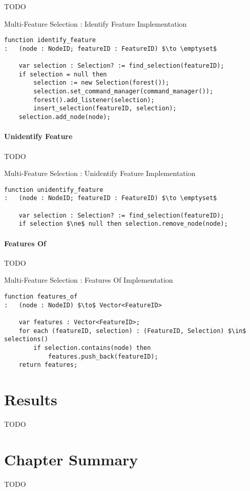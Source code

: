TODO

\begin{stulisting}[p]
\caption{Multi-Feature Selection : Identify Feature Implementation}
\label{code:ipfs-mfs-identifyfeature}
\begin{lstlisting}[style=Default]
function identify_feature
:	(node : NodeID; featureID : FeatureID) $\to \emptyset$

	var selection : Selection? := find_selection(featureID);
	if selection = null then
		selection := new Selection(forest());
		selection.set_command_manager(command_manager());
		forest().add_listener(selection);
		insert_selection(featureID, selection);
	selection.add_node(node);
\end{lstlisting}
\end{stulisting}

\paragraph{Unidentify Feature}

TODO

\begin{stulisting}[p]
\caption{Multi-Feature Selection : Unidentify Feature Implementation}
\label{code:ipfs-mfs-unidentifyfeature}
\begin{lstlisting}[style=Default]
function unidentify_feature
:	(node : NodeID; featureID : FeatureID) $\to \emptyset$

	var selection : Selection? := find_selection(featureID);
	if selection $\ne$ null then selection.remove_node(node);
\end{lstlisting}
\end{stulisting}

\paragraph{Features Of}

TODO

\begin{stulisting}[p]
\caption{Multi-Feature Selection : Features Of Implementation}
\label{code:ipfs-mfs-featuresof}
\begin{lstlisting}[style=Default]
function features_of
:	(node : NodeID) $\to$ Vector<FeatureID>

	var features : Vector<FeatureID>;
	for each (featureID, selection) : (FeatureID, Selection) $\in$ selections()
		if selection.contains(node) then
			features.push_back(featureID);
	return features;
\end{lstlisting}
\end{stulisting}

\section{Results}

TODO

\section{Chapter Summary}

TODO
